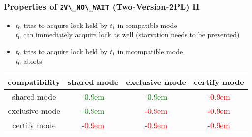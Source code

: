 \begin{frame}
	\frametitle{Properties of \lstinline{2V\_NO\_WAIT} (Two-Version-2PL) II}
	
	\begin{itemize}
		\item	$t_0$ tries to acquire lock held by $t_1$ in compatible mode \\ \bm{$\rightarrow$} $t_0$ can immediately acquire lock as well (starvation needs to be prevented)
		\item	$t_0$ tries to acquire lock held by $t_1$ in incompatible mode \\ \bm{$\rightarrow$} $t_0$ aborts
	\end{itemize}
	\newcommand{\plus}{\textcolor{green!15}{\LARGE\raisebox{-.0875em}{\bm{$\bullet$}}}\textcolor{green}{\kern-0.9em\bm{$\oplus$}}}
	\newcommand{\minus}{\textcolor{red!25}{\LARGE\raisebox{-.0875em}{\bm{$\bullet$}}}\textcolor{red}{\kern-0.9em\bm{$\ominus$}}}
	
	\centering
	\begin{tabular}{| c | c | c | c |}
																		\hline
		compatibility	&	shared mode	&	exclusive mode	&	certify mode	\\	\hline
		shared mode	&	\plus			&	\plus			&	\minus		\\	\hline
		exclusive mode	&	\plus			&	\minus		&	\minus		\\	\hline
		certify mode	&	\minus		&	\minus		&	\minus		\\	\hline
	\end{tabular}
\end{frame}

